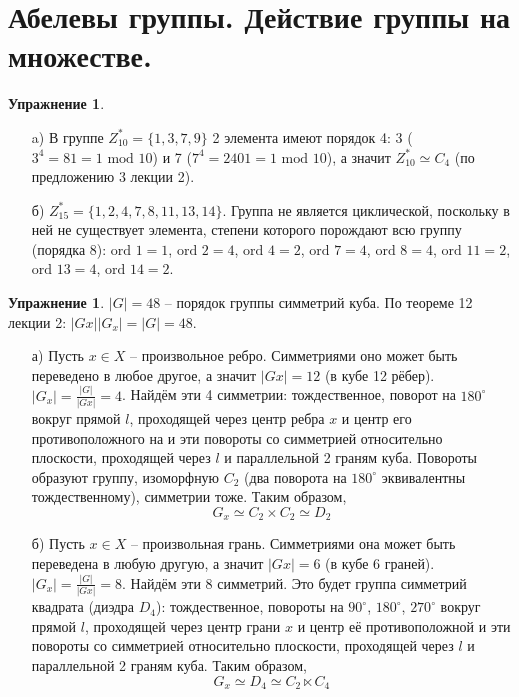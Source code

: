 \documentclass[12pt]{article}
\theoremstyle{definition}
\newtheorem{upr}[zad]{Упражнение}
\begin{document}
\section{Абелевы группы. Действие группы на множестве.}
\begin{upr}
\begin{itemize}
    \item[a)] В группе $Z^*_{10}=\{1,3,7,9\}$ 2 элемента имеют порядок 4: 3 ($3^4=81=1 \text{ mod } 10$) и 7 ($7^4=2401=1\text{ mod }10$), а значит $Z^*_{10}\simeq C_4$ (по предложению 3 лекции 2).
    \item[б)] $Z^*_{15}=\{1,2,4,7,8,11,13,14\}$. Группа не является циклической, поскольку в ней не существует элемента, степени которого порождают всю группу (порядка 8): $\text{ord } 1=1$, $\text{ord } 2=4$, $\text{ord } 4=2$, $\text{ord } 7=4$, $\text{ord } 8=4$, $\text{ord } 11=2$, $\text{ord } 13=4$, $\text{ord } 14=2$.
\end{itemize}
\end{upr}
\begin{upr}
    $|G|=48$ -- порядок группы симметрий куба. По теореме 12 лекции 2: $|Gx||G_x|=|G|=48$.
\begin{itemize}
    \item[а)] Пусть $x\in X$ -- произвольное ребро. Симметриями оно может быть переведено в любое другое, а значит $|Gx|=12$ (в кубе 12 рёбер). $|G_x|=\frac{|G|}{|Gx|}=4$. Найдём эти 4 симметрии: тождественное, поворот на $180^\circ$ вокруг прямой $l$, проходящей через центр ребра $x$ и центр его противоположного на и эти повороты со симметрией относительно плоскости, проходящей через $l$ и параллельной 2 граням куба. Повороты образуют группу, изоморфную $C_2$ (два поворота на $180^\circ$ эквивалентны тождественному), симметрии тоже. Таким образом, 
    \begin{equation}
        \boxed{G_x\simeq C_2\times C_2\simeq D_2}
    \end{equation}
    \item[б)] Пусть $x\in X$ -- произвольная грань. Симметриями она может быть переведена в любую другую, а значит $|Gx|=6$ (в кубе 6 граней). $|G_x|=\frac{|G|}{|Gx|}=8$. Найдём эти 8 симметрий. Это будет группа симметрий квадрата (диэдра $D_4$): тождественное, повороты на $90^\circ$, $180^\circ$, $270^\circ$ вокруг прямой $l$, проходящей через центр грани $x$ и центр её противоположной и эти повороты со симметрией относительно плоскости, проходящей через $l$ и параллельной 2 граням куба. Таким образом,
    \begin{equation}
        \boxed{G_x\simeq D_4 \simeq C_2\ltimes C_4}
    \end{equation}
\end{itemize}
\end{upr}
\end{document}

